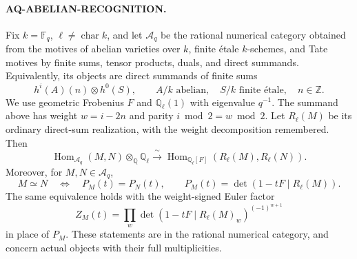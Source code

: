 \documentclass[11pt,a4paper]{article}
\theoremstyle{definition}\newtheorem{definition}[theorem]{Definition}
\theoremstyle{remark}\newtheorem{remark}[theorem]{Remark}
\begin{document}
\paragraph{AQ-ABELIAN-RECOGNITION.}
Fix $k=\mathbb F_q$, $\ell\ne\operatorname{char}k$,
and let $\mathcal A_q$ be the rational numerical
category obtained from the motives of abelian
varieties over $k$, finite \'etale $k$-schemes, and
Tate motives by finite sums, tensor products,
duals, and direct summands. Equivalently, its
objects are direct summands of finite sums
\[
 h^i(A)(n)\otimes h^0(S),\qquad
 A/k\text{ abelian},\quad S/k\text{ finite \'etale},
 \quad n\in\mathbb Z.
\]
We use geometric Frobenius $F$ and
$\mathbb Q_\ell(1)$ with eigenvalue $q^{-1}$.
The summand above has weight $w=i-2n$ and
parity $i\bmod2=w\bmod2$.
Let $R_\ell(M)$ be its ordinary direct-sum
realization, with the weight decomposition remembered.
Then
\[
 \operatorname{Hom}_{\mathcal A_q}(M,N)\otimes_{\mathbb Q}\mathbb Q_\ell
 \xrightarrow{\ \sim\ }
 \operatorname{Hom}_{\mathbb Q_\ell[F]}
       (R_\ell(M),R_\ell(N)).                         \tag{AQ.15}
\]
Moreover, for $M,N\in\mathcal A_q$,
\[
 M\simeq N\quad\Longleftrightarrow\quad
 P_M(t)=P_N(t),\qquad
 P_M(t)=\det(1-tF\mid R_\ell(M)).                    \tag{AQ.16}
\]
The same equivalence holds with the weight-signed
Euler factor
\[
 Z_M(t)=\prod_w
 \det(1-tF\mid R_\ell(M)_w)^{(-1)^{w+1}}            \tag{AQ.17}
\]
in place of $P_M$. These statements are in the
rational numerical category, and concern actual
objects with their full multiplicities.
\end{document}
